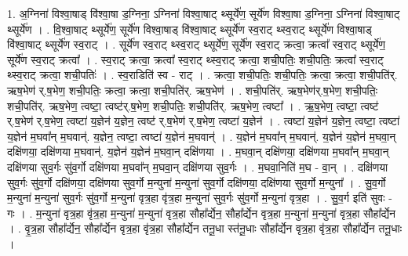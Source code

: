 \documentclass[17pt]{extarticle}
\begin{document}
1. अ॒ग्निना॑ विश्वा॒षाड् वि॑श्वा॒षा ड॒ग्निना॒ ऽग्निना॑ विश्वा॒षाट् थ्सूर्ये॑ण॒ सूर्ये॑ण विश्वा॒षा ड॒ग्निना॒ ऽग्निना॑ विश्वा॒षाट् थ्सूर्ये॑ण । . वि॒श्वा॒षाट् थ्सूर्ये॑ण॒ सूर्ये॑ण विश्वा॒षाड् वि॑श्वा॒षाट् थ्सूर्ये॑ण स्व॒राट् थ्स्व॒राट् थ्सूर्ये॑ण विश्वा॒षाड् वि॑श्वा॒षाट् थ्सूर्ये॑ण स्व॒राट् । . सूर्ये॑ण स्व॒राट् थ्स्व॒राट् थ्सूर्ये॑ण॒ सूर्ये॑ण स्व॒राट् क्रत्वा॒ क्रत्वा᳚ स्व॒राट् थ्सूर्ये॑ण॒ सूर्ये॑ण स्व॒राट् क्रत्वा᳚ । . स्व॒राट् क्रत्वा॒ क्रत्वा᳚ स्व॒राट् थ्स्व॒राट् क्रत्वा॒ शची॒पतिः॒ शची॒पतिः॒ क्रत्वा᳚ स्व॒राट् थ्स्व॒राट् क्रत्वा॒ शची॒पतिः॑ । . स्व॒राडिति॑ स्व - राट् । . क्रत्वा॒ शची॒पतिः॒ शची॒पतिः॒ क्रत्वा॒ क्रत्वा॒ शची॒पति॑र्. ऋष॒भेण॑ र्.ष॒भेण॒ शची॒पतिः॒ क्रत्वा॒ क्रत्वा॒ शची॒पति॑र्. ऋष॒भेण॑ । . शची॒पति॑र्. ऋष॒भेण॑र्.ष॒भेण॒ शची॒पतिः॒ शची॒पति॑र्. ऋष॒भेण॒ त्वष्टा॒ त्वष्ट॑र्.ष॒भेण॒ शची॒पतिः॒ शची॒पति॑र्. ऋष॒भेण॒ त्वष्टा᳚ । . ऋ॒ष॒भेण॒ त्वष्टा॒ त्वष्ट॑ र्.ष॒भेण॑ र्.ष॒भेण॒ त्वष्टा॑ य॒ज्ञेन॑ य॒ज्ञेन॒ त्वष्ट॑ र्.ष॒भेण॑ र्.ष॒भेण॒ त्वष्टा॑ य॒ज्ञेन॑ । . त्वष्टा॑ य॒ज्ञेन॑ य॒ज्ञेन॒ त्वष्टा॒ त्वष्टा॑ य॒ज्ञेन॑ म॒घवा᳚न् म॒घवान्॑. य॒ज्ञेन॒ त्वष्टा॒ त्वष्टा॑ य॒ज्ञेन॑ म॒घवान्॑ । . य॒ज्ञेन॑ म॒घवा᳚न् म॒घवान्॑. य॒ज्ञेन॑ य॒ज्ञेन॑ म॒घवा॒न् दक्षि॑णया॒ दक्षि॑णया म॒घवान्॑. य॒ज्ञेन॑ य॒ज्ञेन॑ म॒घवा॒न् दक्षि॑णया । . म॒घवा॒न् दक्षि॑णया॒ दक्षि॑णया म॒घवा᳚न् म॒घवा॒न् दक्षि॑णया सुव॒र्गः सु॑व॒र्गो दक्षि॑णया म॒घवा᳚न् म॒घवा॒न् दक्षि॑णया सुव॒र्गः । . म॒घवा॒निति॑ म॒घ - वा॒न् । . दक्षि॑णया सुव॒र्गः सु॑व॒र्गो दक्षि॑णया॒ दक्षि॑णया सुव॒र्गो म॒न्युना॑ म॒न्युना॑ सुव॒र्गो दक्षि॑णया॒ दक्षि॑णया सुव॒र्गो म॒न्युना᳚ । . सु॒व॒र्गो म॒न्युना॑ म॒न्युना॑ सुव॒र्गः सु॑व॒र्गो म॒न्युना॑ वृत्र॒हा वृ॑त्र॒हा म॒न्युना॑ सुव॒र्गः 
सु॑व॒र्गो म॒न्युना॑ वृत्र॒हा । . सु॒व॒र्ग इति॑ सुवः - गः । . म॒न्युना॑ वृत्र॒हा वृ॑त्र॒हा म॒न्युना॑ म॒न्युना॑ वृत्र॒हा सौहा᳚र्द्येन॒ सौहा᳚र्द्येन वृत्र॒हा म॒न्युना॑ 
म॒न्युना॑ वृत्र॒हा सौहा᳚र्द्येन । . वृ॒त्र॒हा सौहा᳚र्द्येन॒ सौहा᳚र्द्येन वृत्र॒हा वृ॑त्र॒हा सौहा᳚र्द्येन तनू॒धा स्त॑नू॒धाः सौहा᳚र्द्येन वृत्र॒हा वृ॑त्र॒हा सौहा᳚र्द्येन तनू॒धाः । \newline
\end{document}
